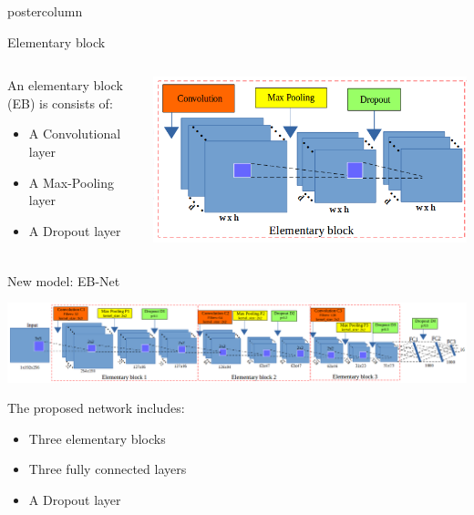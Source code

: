 \begin{frame}
\begin{columns}
\begin{column}{.49\textwidth}
\begin{beamercolorbox}[center,wd=\textwidth]{postercolumn}
\begin{minipage}[T]{.95\textwidth}
{            \begin{block}{Elementary block}
            	\begin{columns}
            		\begin{column}{.45\textwidth}
            			An elementary block (EB) is consists of:
            			\begin{itemize}
            				\item A Convolutional layer
            				\item A Max-Pooling layer
            				\item A Dropout layer
            			\end{itemize}
            		\end{column}
            		\begin{column}{.54\textwidth}
            			\centering
            			\includegraphics[width=.85\textwidth]{images/elementary_block.png}
            		\end{column}
            	\end{columns}
            \end{block}
            
            \vfill
            
            \begin{block}{New model: EB-Net}
            	\begin{center}
            		\includegraphics[width=.96\textwidth]{images/arch_model.png}\\
            	\end{center}
            The proposed network includes:
            \begin{itemize}
            	\item Three elementary blocks
            	\item Three fully connected layers
            	\item A Dropout layer
            \end{itemize}
            \end{block}
  
}
\end{minipage}
\end{beamercolorbox}
\end{column}
\end{columns}
\end{frame}
